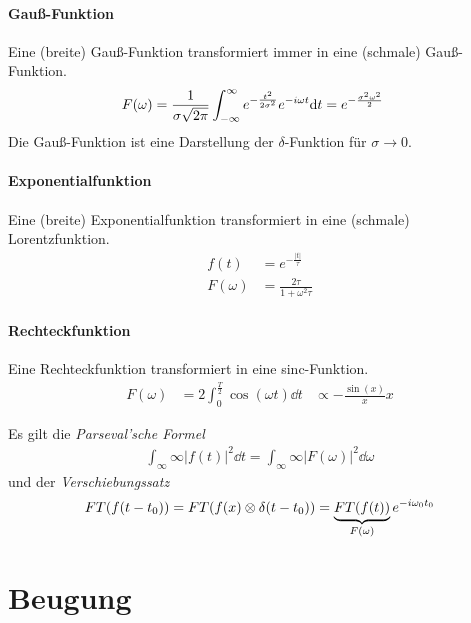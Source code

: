 \paragraph{Gauß-Funktion} Eine (breite) Gauß-Funktion transformiert
immer in eine (schmale) Gauß-Funktion.
\begin{align*}
	F(\omega) &= \frac{1}{\sigma\sqrt{2\pi}}\int_{-\infty}^{\infty}
                e^{-\frac{t^2}{2\sigma^2}} e^{-i\omega t} \mathrm{d} t
                = e^{-\frac{\sigma^2\omega^2}{2}}
\end{align*}
Die Gauß-Funktion ist eine Darstellung der $\delta$-Funktion für
$\sigma\longrightarrow 0$.

\paragraph{Exponentialfunktion} Eine (breite) Exponentialfunktion
transformiert in eine (schmale) Lorentzfunktion.
\begin{align*}
	f(t) &= e^{-\frac{\vert t\vert}{\tau}}\\
	F(\omega) &= \frac{2\tau}{1+\omega^2\tau}
\end{align*}

\paragraph{Rechteckfunktion} Eine Rechteckfunktion transformiert in
eine sinc-Funktion.
\begin{align*}
  F(\omega) &= 2\int_{0}^{\frac{T}{2}}\cos(\omega t)\dd t
  &\propto -\frac{\sin(x)}{x} x
\end{align*}


Es gilt die \emph{Parseval'sche Formel}
\begin{gather*}
  \int_{\infty}{\infty} |f(t)|^2 \dd t 
  = \int_{\infty}{\infty} |F(\omega)|^2 \dd\omega
\end{gather*}
und der \emph{Verschiebungssatz}
\begin{align*}
  FT(f(t-t_0)) = FT(f(x)\otimes\delta(t-t_0))
  = \underbrace{FT(f(t))}_{F(\omega)}e^{-i\omega_0 t_0}
\end{align*}


\section{Beugung}
